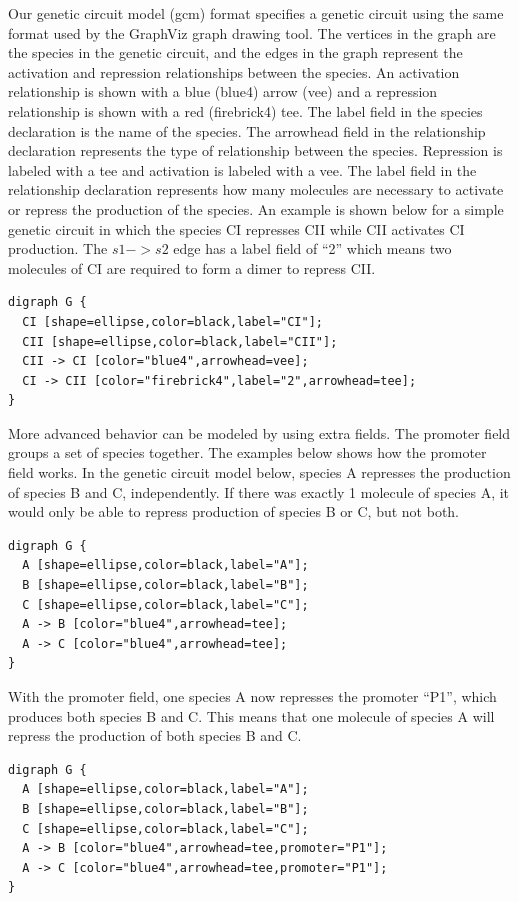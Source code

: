 \documentclass[titlepage,11pt]{article}
\begin{document}
\noindent
Our genetic circuit model (gcm) format specifies a genetic
circuit using the same format used by the GraphViz graph drawing
tool.  The vertices in the graph are the species in
the genetic circuit, and the edges in the graph represent the
activation and repression relationships between the species. An
activation relationship is shown with a blue (blue4) arrow (vee)
and a repression relationship is shown with a red (firebrick4)
tee. The label field in the species declaration is the name of
the species. The arrowhead field in the relationship declaration
represents the type of relationship between the species.
Repression is labeled with a tee and activation is labeled with a
vee. The label field in the relationship declaration represents
how many molecules are necessary to activate or repress the
production of the species. An example is shown below for a simple
genetic circuit in which the species CI represses CII while CII
activates CI production. The $s1 -> s2$ edge has a label field of
``2'' which means two molecules of CI are required to form a dimer 
to repress CII. 

\begin{verbatim}
digraph G {
  CI [shape=ellipse,color=black,label="CI"];
  CII [shape=ellipse,color=black,label="CII"];
  CII -> CI [color="blue4",arrowhead=vee];
  CI -> CII [color="firebrick4",label="2",arrowhead=tee];
}
\end{verbatim}

More advanced behavior can be modeled by using extra fields.
The promoter field groups a set of species together. The examples
below shows how the promoter field works. In the genetic circuit
model below, species A represses the production of species B and
C, independently. If there was exactly 1 molecule of species A,
it would only be able to repress production of species B or C,
but not both. 

\begin{verbatim}
digraph G {
  A [shape=ellipse,color=black,label="A"];
  B [shape=ellipse,color=black,label="B"];
  C [shape=ellipse,color=black,label="C"];
  A -> B [color="blue4",arrowhead=tee];
  A -> C [color="blue4",arrowhead=tee];
} 
\end{verbatim}

With the promoter field, one species A now represses the
promoter ``P1'', which produces both species B and C.
This means that one molecule of species A will repress the
production of both species B and C. 

\begin{verbatim}
digraph G {
  A [shape=ellipse,color=black,label="A"];
  B [shape=ellipse,color=black,label="B"];
  C [shape=ellipse,color=black,label="C"];
  A -> B [color="blue4",arrowhead=tee,promoter="P1"];
  A -> C [color="blue4",arrowhead=tee,promoter="P1"];
}
\end{verbatim}
\end{document}
